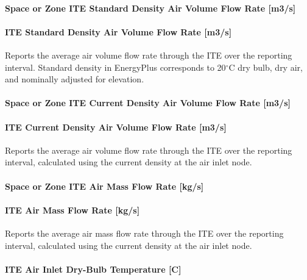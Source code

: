 \paragraph{Space or Zone ITE Standard Density Air Volume Flow Rate {[}m3/s{]}}\label{zone-ite-standard-density-air-volume-flow-rate-m3s}

\paragraph{ITE Standard Density Air Volume Flow Rate {[}m3/s{]}}\label{ite-standard-density-air-volume-flow-rate-m3s}

Reports the average air volume flow rate through the ITE over the reporting interval. Standard density in EnergyPlus corresponds to 20$^\circ$C dry bulb, dry air, and nominally adjusted for elevation.

\paragraph{Space or Zone ITE Current Density Air Volume Flow Rate {[}m3/s{]}}\label{zone-ite-current-density-air-volume-flow-rate-m3s}

\paragraph{ITE Current Density Air Volume Flow Rate {[}m3/s{]}}\label{ite-current-density-air-volume-flow-rate-m3s}

Reports the average air volume flow rate through the ITE over the reporting interval, calculated using the current density at the air inlet node.

\paragraph{Space or Zone ITE Air Mass Flow Rate {[}kg/s{]}}\label{zone-ite-air-mass-flow-rate-kgs}

\paragraph{ITE Air Mass Flow Rate {[}kg/s{]}}\label{ite-air-mass-flow-rate-kgs}

Reports the average air mass flow rate through the ITE over the reporting interval, calculated using the current density at the air inlet node.

\paragraph{ITE Air Inlet Dry-Bulb Temperature {[}C{]}}\label{ite-air-inlet-dry-bulb-temperature-c}

